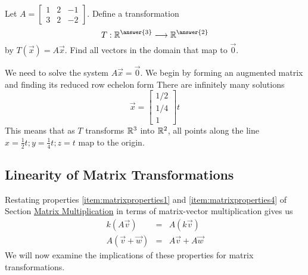 \documentclass{ximera}
\begin{document}
\begin{example}\label{ex:matrixTrans1}
    Let $A=\begin{bmatrix}1&2&-1\\3&2&-2\end{bmatrix}$.  Define a transformation 
    $$T:\RR^{\answer{3}}\longrightarrow\RR^{\answer{2}}$$ by 
    $T(\vec{x})=A\vec{x}$.  Find all vectors in the domain that map to $\vec{0}$.
 \begin{explanation}
    We need to solve the system $A\vec{x}=\vec{0}$.  We begin by forming an augmented matrix and finding its reduced row echelon form
 There are infinitely many solutions
 $$\vec{x}=\begin{bmatrix}1/2\\1/4\\1\end{bmatrix}t$$
 This means that as $T$ transforms $\mathbb{R}^3$ into $\mathbb{R}^2$, all points along the line $x=\frac{1}{2}t; y=\frac{1}{4}t; z=t$ map to the origin.
\end{explanation}    
\end{example}

\subsection*{Linearity of Matrix Transformations}
Restating properties \ref{item:matrixproperties1} and \ref{item:matrixproperties4} of Section \href{https://ximera.osu.edu/oerlinalg/LinearAlgebra/MAT-0020/main}{Matrix Multiplication} in terms of matrix-vector multiplication gives us
\begin{eqnarray}\label{eq:linearityConstant}
 k(A\vec{v})&=&A(k\vec{v})\\
    A(\vec{v}+\vec{w})&=&A\vec{v}+A\vec{w}\label{eq:linearityAdd}
   \end{eqnarray}
We will now examine the implications of these properties for matrix transformations.
\end{document}

